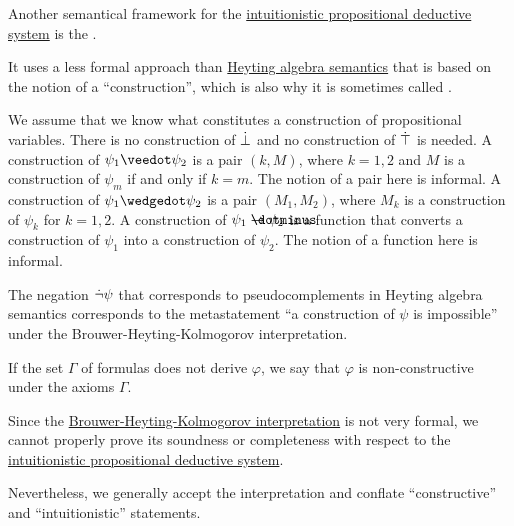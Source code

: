 \begin{concept}\label{con:brouwer_heyting_kolmogorov_interpretation}
  Another semantical framework for the \hyperref[def:intuitionistic_propositional_deductive_systems]{intuitionistic propositional deductive system} is the .

  It uses a less formal approach than \hyperref[def:propositional_heyting_algebra_semantics]{Heyting algebra semantics} that is based on the notion of a \enquote{construction}, which is also why it is sometimes called .

  \begin{thmenum}
     We assume that we know what constitutes a construction of propositional variables.
     There is no construction of \( \dot\bot \) and no construction of \( \dot\top \) is needed.
     A construction of \( \psi_1 \synvee \psi_2 \) is a pair \( (k, M) \), where \( k = 1, 2 \) and \( M \) is a construction of \( \psi_m \) if and only if \( k = m \). The notion of a pair here is informal.
     A construction of \( \psi_1 \synwedge \psi_2 \) is a pair \( (M_1, M_2) \), where \( M_k \) is a construction of \( \psi_k \) for \( k = 1, 2 \).
     A construction of \( \psi_1 \synimplies \psi_2 \) is a function that converts a construction of \( \psi_1 \) into a construction of \( \psi_2 \). The notion of a function here is informal.
  \end{thmenum}

  The negation \( \dot\neg\psi \) that corresponds to pseudocomplements in Heyting algebra semantics corresponds to the metastatement \enquote{a construction of \( \psi \) is impossible} under the Brouwer-Heyting-Kolmogorov interpretation.

  If the set \( \Gamma \) of formulas does not derive \( \varphi \), we say that \( \varphi \) is non-constructive under the axioms \( \Gamma \).
\end{concept}

\begin{remark}\label{rem:brouwer_heyting_kolmogorov_interpretation_compatibility}
  Since the \hyperref[con:brouwer_heyting_kolmogorov_interpretation]{Brouwer-Heyting-Kolmogorov interpretation} is not very formal, we cannot properly prove its soundness or completeness with respect to the \hyperref[def:intuitionistic_propositional_deductive_systems]{intuitionistic propositional deductive system}.

  Nevertheless, we generally accept the interpretation and conflate \enquote{constructive} and \enquote{intuitionistic} statements.
\end{remark}

